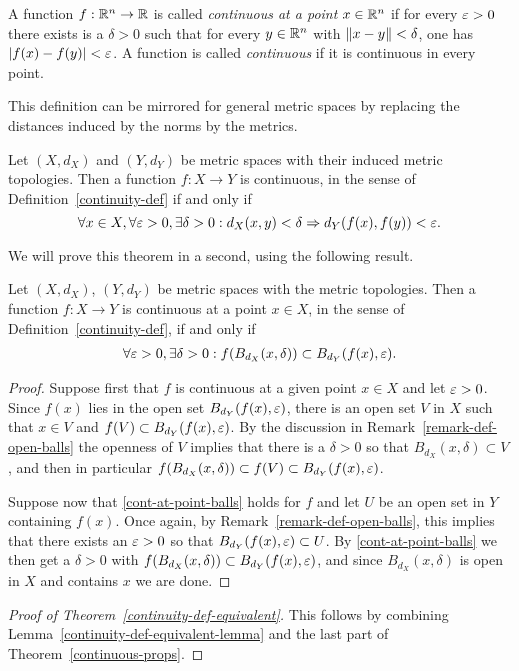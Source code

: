 \begin{defn}
  A function $f : \mathbb{R}^n \to \mathbb{R}$ is called \emph{continuous at a point} $x \in \mathbb{R}^n$ if for every $\varepsilon > 0$ there exists is a $\delta > 0$ such that for every $y \in \mathbb{R}^n$ with $\lVert x-y \rVert < \delta$, one has $\lvert f(x)-f(y) \rvert < \varepsilon$. A function is called \emph{continuous} if it is continuous in every point.
\end{defn}
This definition can be mirrored for general metric spaces by replacing the distances induced by the norms by the metrics.
\begin{thm}
  \label{continuity-def-equivalent}
  Let $(X,d_X)$ and $(Y,d_Y)$ be metric spaces with their induced metric topologies. Then a function $f : X \to Y$ is continuous, in the sense of Definition~\ref{continuity-def} if and only if
  \[
    \forall x \in X, \forall \varepsilon > 0, \exists \delta > 0 : d_X(x,y) < \delta \Rightarrow d_Y(f(x),f(y)) < \varepsilon.
  \]
\end{thm}
We will prove this theorem in a second, using the following result.
\begin{lem}
  \label{continuity-def-equivalent-lemma}
  Let $(X,d_X)$, $(Y,d_Y)$ be metric spaces with the metric topologies. Then a function $f : X \to Y$ is continuous at a point $x \in X$, in the sense of Definition~\ref{continuity-def}, if and only if
  \begin{align}
    \label{cont-at-point-balls}
    \forall \varepsilon > 0, \exists \delta > 0 : f(B_{d_X}(x,\delta)) \subset B_{d_Y}(f(x),\varepsilon).
  \end{align}
\end{lem}
\begin{proof}
  Suppose first that $f$ is continuous at a given point $x \in X$ and let $\varepsilon > 0$. Since $f(x)$ lies in the open set $B_{d_Y}(f(x),\varepsilon)$, there is an open set $V$ in $X$ such that $x \in V$ and $f(V) \subset B_{d_Y}(f(x),\varepsilon)$. By the discussion in Remark~\ref{remark-def-open-balls} the openness of $V$ implies that there is a $\delta > 0$ so that $B_{d_X}(x,\delta) \subset V$, and then in particular $f(B_{d_X}(x,\delta)) \subset f(V) \subset B_{d_Y}(f(x),\varepsilon)$.
  
  Suppose now that \eqref{cont-at-point-balls} holds for $f$ and let $U$ be an open set in $Y$ containing $f(x)$. Once again, by Remark~\ref{remark-def-open-balls}, this implies that there exists an $\varepsilon > 0$ so that $B_{d_Y}(f(x),\varepsilon) \subset U$. By \eqref{cont-at-point-balls} we then get a $\delta > 0$ with $f(B_{d_X}(x,\delta)) \subset B_{d_Y}(f(x),\varepsilon)$, and since $B_{d_X}(x,\delta)$ is open in $X$ and contains $x$ we are done.
\end{proof}
\begin{proof}[Proof of Theorem~\ref{continuity-def-equivalent}]
  This follows by combining Lemma~\ref{continuity-def-equivalent-lemma} and the last part of Theorem~\ref{continuous-props}.
\end{proof}

